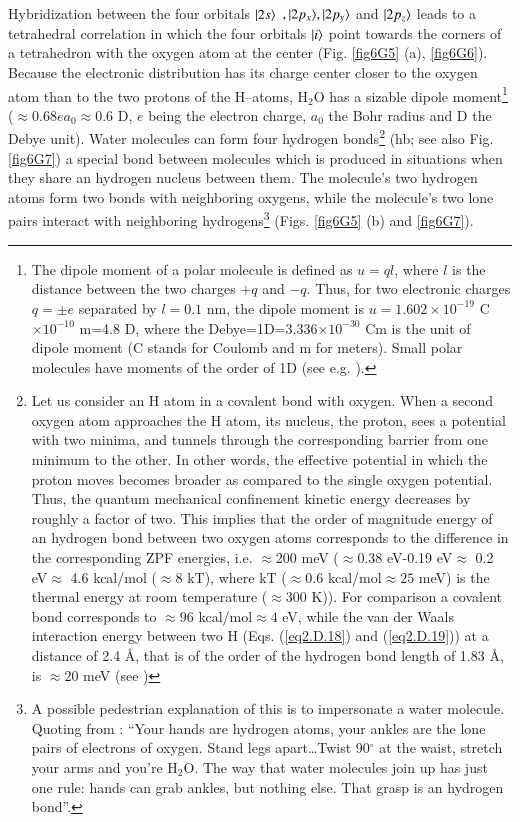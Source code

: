\begin{subappendices}
Hybridization between the four orbitals $|{2s} \rangle$ $,|{2p_x} \rangle,|{2p_y} \rangle$ and $|{2p_z} \rangle$  leads to a tetrahedral correlation in which the four orbitals $|{i} \rangle$ point towards the corners of a tetrahedron with the oxygen atom at the center (Fig. \ref{fig6G5} (a), \ref{fig6G6}). Because the electronic distribution has its charge center closer to the oxygen atom than to the two protons of the H--atoms, H$_2$O has a sizable dipole moment\footnote{The dipole moment of a polar molecule is defined as $u=ql$, where $l$ is the distance between the two charges $+q$ and $-q$. Thus, for two electronic charges $q=\pm e$ separated by $l=0.1$ nm, the dipole moment is $u=1.602\times 10^{-19}$ C$\times10^{-10}$ m=4.8 D, where the Debye=1D=3.336$\times10^{-30}$ Cm is the unit of dipole moment (C stands for Coulomb and m for meters). Small polar molecules have moments of the order of 1D (see e.g. \cite{Israelachvili:85}).} ($\approx 0.68 ea_0\approx0.6$ D, $e$ being the electron charge, $a_0$ the Bohr radius and D the Debye unit). Water molecules can form four hydrogen bonds\footnote{Let us consider an H atom in a covalent bond with oxygen. When a second oxygen atom approaches the H atom, its nucleus, the proton, sees a potential with two minima, and tunnels through the corresponding barrier from one minimum to the other. In other words, the effective potential in which the proton moves becomes broader as compared to the single oxygen potential. Thus, the quantum mechanical confinement kinetic energy decreases by roughly a factor of two. This implies that the order of magnitude energy of an hydrogen bond between two oxygen atoms corresponds to the difference in the corresponding ZPF energies, i.e. $\approx200$ meV ($\approx 0.38$ eV-0.19 eV$\approx$ 0.2 eV$\approx$ 4.6 kcal/mol ($\approx8$ kT), where kT ($\approx0.6$ kcal/mol$\approx25$ meV) is the thermal energy at room temperature ($\approx300$ K)). For comparison a covalent  bond corresponds to $\approx96$ kcal/mol$\approx4$ eV, while the van der Waals interaction energy between two H (Eqs. (\ref{eq2.D.18}) and (\ref{eq2.D.19})) at a distance of 2.4 \AA, that is of the order of the hydrogen bond length of 1.83 \AA,  is $\approx20$ meV (see \cite{Povh:02})} (hb; see also Fig. \ref{fig6G7}) a special bond between molecules which is produced in situations when they share an hydrogen nucleus between them. The molecule's two hydrogen atoms form two bonds with neighboring oxygens, while the molecule's two lone pairs interact with neighboring hydrogens\footnote{A possible pedestrian explanation of this is to impersonate a water molecule. Quoting from \cite{Ball:03}: ``Your hands are hydrogen atoms, your ankles are the lone pairs of electrons of oxygen. Stand legs apart\dots Twist 90$^\circ$ at the waist, stretch your arms and you're H$_2$O. The way that water molecules join up has just one rule: hands can grab ankles, but nothing else. That grasp is an hydrogen bond''.} (Figs. \ref{fig6G5} (b) and \ref{fig6G7}). 



\end{subappendices}
